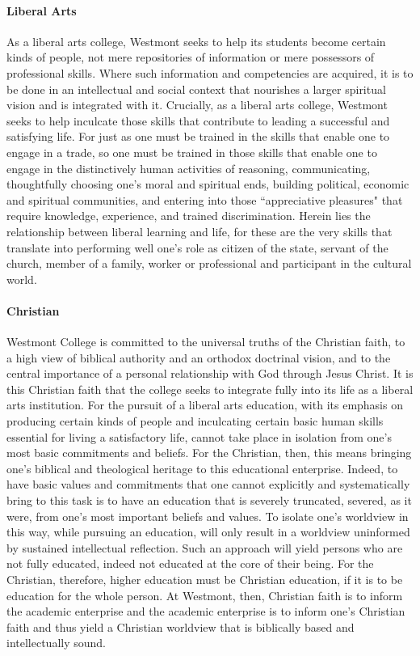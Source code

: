 			\paragraph {Liberal Arts}
				As a liberal arts college, Westmont seeks to help its students become certain kinds of people, not mere
				repositories of information or mere possessors of professional skills.  Where such information and
				competencies are acquired, it is to be done in an intellectual and social context that nourishes a
				larger spiritual vision and is integrated with it.  Crucially, as a liberal arts college, Westmont seeks
				to help inculcate those skills that contribute to leading a successful and satisfying life.  For just as
				one must be trained in the skills that enable one to engage in a trade, so one must be trained in those
				skills that enable one to engage in the distinctively human activities of reasoning, communicating,
				thoughtfully choosing one's moral and spiritual ends, building political, economic and spiritual
				communities, and entering into those ``appreciative pleasures" that require knowledge, experience, and
				trained discrimination. Herein lies the relationship between liberal learning and life, for these are
				the very skills that translate into performing well one's role as citizen of the state, servant of the
				church, member of a family, worker or professional and participant in the cultural world.
			\paragraph{Christian}
				Westmont College is committed to the universal truths of the Christian faith, to a high view of biblical
				authority and an orthodox doctrinal vision, and to the central importance of a personal relationship
				with God through Jesus Christ.  It is this Christian faith that the college seeks to integrate fully
				into its life as a liberal arts institution.  For the pursuit of a liberal arts education, with its
				emphasis on producing certain kinds of people and inculcating certain basic human skills essential for
				living a satisfactory life, cannot take place in isolation from one's most basic commitments and
				beliefs.  For the Christian, then, this means bringing one's biblical and theological heritage to this
				educational enterprise. Indeed, to have basic values and commitments that one cannot explicitly and
				systematically bring to this task is to have an education that is severely truncated, severed, as it
				were, from one's most important beliefs and values.  To isolate one's worldview in this way, while
				pursuing an education, will only result in a worldview uninformed by sustained intellectual reflection.
				Such an approach will yield persons who are not fully educated, indeed not educated at the core of their
				being.  For the Christian, therefore, higher education must be Christian education, if it is to be
				education for the whole person.  At Westmont, then, Christian faith is to inform the academic enterprise
				and the academic enterprise is to inform one's Christian faith and thus yield a Christian worldview that
				is biblically based and intellectually sound.
